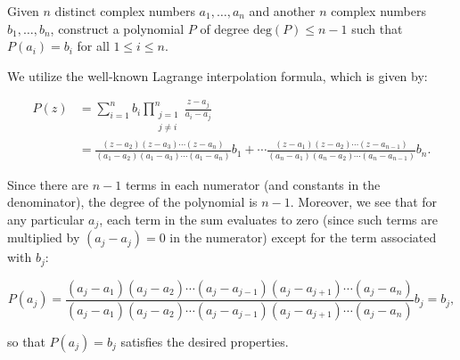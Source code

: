 Given $n$ distinct complex numbers $a_1, \dots, a_n$ and another $n$ complex numbers $b_1, \dots, b_n$, construct a 
polynomial $P$ of degree $\text{deg}(P) \leq n - 1$ such that $P(a_i) = b_i$ for all $1 \le i \le n$.

\begin{solution}
  We utilize the well-known Lagrange interpolation formula, which is given by:

  \begin{align*}
  P(z) &= \sum_{i=1}^{n} b_i \prod_{\substack{j=1 \\ j \neq i}}^{n} \frac{z - a_j}{a_i - a_j} \\
       &= \frac{(z - a_2)(z - a_3)\cdots(z - a_n)}{(a_1 - a_2)(a_1 - a_3)\cdots(a_1 - a_n)} b_1 + \cdots
         \frac{(z - a_1)(z - a_2)\cdots(z - a_{n-1})}{(a_n - a_1)(a_n - a_2)\cdots(a_n - a_{n-1})} b_n.
  \end{align*}

  Since there are $n-1$ terms in each numerator (and constants in the denominator), the degree of the polynomial is 
  $n-1$. Moreover, we see that for any particular $a_j$, each term in the sum evaluates to zero (since such terms 
  are multiplied by $(a_j - a_j) = 0$ in the numerator) except for the term associated with $b_j$:

  $$
  P(a_j) = \frac{(a_j - a_1)(a_j - a_2)\cdots(a_j - a_{j-1})(a_j - a_{j+1})\cdots(a_j - a_n)}
                {(a_j - a_1)(a_j - a_2)\cdots(a_j - a_{j-1})(a_j - a_{j+1})\cdots(a_j - a_n)} b_j
         = b_j,
  $$

  so that $P(a_j) = b_j$ satisfies the desired properties.
  \ \\
\end{solution}

